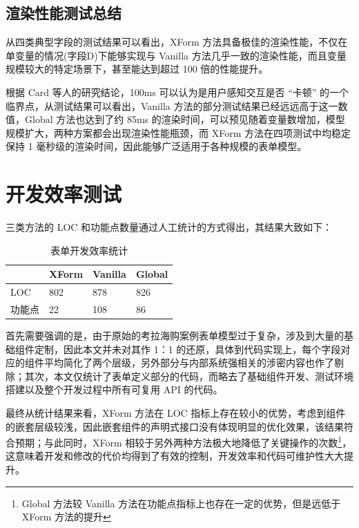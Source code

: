 \documentclass[winfonts,master,twoside]{njuthesis}
\begin{document}
\subsection{渲染性能测试总结}

从四类典型字段的测试结果可以看出，XForm 方法具备极佳的渲染性能，不仅在单变量的情况(字段D)下能够实现与 Vanilla 方法几乎一致的渲染性能，而且变量规模较大的特定场景下，甚至能达到超过 100 倍的性能提升。

根据 Card 等人的研究结论\cite{card1991information}，100ms 可以认为是用户感知交互是否 “卡顿” 的一个临界点，从测试结果可以看出，Vanilla 方法的部分测试结果已经远远高于这一数值，Global 方法也达到了约 85ms 的渲染时间，可以预见随着变量数增加，模型规模扩大，两种方案都会出现渲染性能瓶颈，而 XForm 方法在四项测试中均稳定保持 1 毫秒级的渲染时间，因此能够广泛适用于各种规模的表单模型。

\section{开发效率测试}

三类方法的 LOC 和功能点数量通过人工统计的方式得出，其结果大致如下：

\begin{table}[h]
    \centering
    \begin{tabular}{|l|l|l|l|}
        \hline
                 & XForm & Vanilla & Global \\ \hline
        LOC      & 802   & 878     & 826    \\ \hline
        功能点 & 22    & 108     & 86     \\ \hline
    \end{tabular}
    \caption{表单开发效率统计}
\end{table}

首先需要强调的是，由于原始的考拉海购案例表单模型过于复杂，涉及到大量的基础组件定制，因此本文并未对其作 1：1 的还原，具体到代码实现上，每个字段对应的组件平均简化了两个层级，另外部分与内部系统强相关的涉密内容也作了剔除；其次，本文仅统计了表单定义部分的代码，而略去了基础组件开发、测试环境搭建以及整个开发过程中所有可复用 API 的代码。

最终从统计结果来看，XForm 方法在 LOC 指标上存在较小的优势，考虑到组件的嵌套层级较浅，因此嵌套组件的声明式接口没有体现明显的优化效果，该结果符合预期；与此同时，XForm 相较于另外两种方法极大地降低了关键操作的次数\footnote{Global 方法较 Vanilla 方法在功能点指标上也存在一定的优势，但是远低于 XForm 方法的提升}，这意味着开发和修改的代价均得到了有效的控制，开发效率和代码可维护性大大提升。
\end{document}
